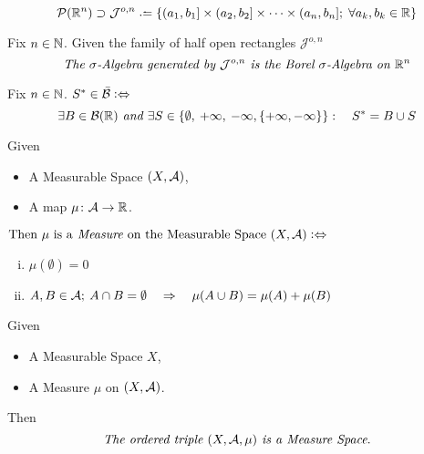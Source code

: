 \begin{definition}
$$\P(\R^n) \supset \J \defeq \{(a_1, b_1] \times (a_2, b_2] \times \dots \times (a_n, b_n]; \; \forall a_k, b_k \in \R\}$$
\end{definition}

\begin{definition}
Fix $n \in \mathbb{N}$. Given the family of half open rectangles $\mathcal{J}^{o,n}$
$$ \text{\it The } \sigma\text{\it -Algebra generated by } \mathcal{J}^{o,n}\text{\it\ is the Borel }\sigma\text{\it-Algebra on }\mathbb{R}^n$$
\end{definition}

\begin{definition}
Fix $n \in \mathbb{N}$. $S^* \in \bar {\mathcal{B}} \mathrel{\vcentcolon\Leftrightarrow}$
$$\exists B \in \mathcal{B}(\mathbb{R}) \text{\it\ and }\exists S \in \{\emptyset,\> +\infty,\> -\infty, \{+\infty, -\infty\}\}: \quad S^* = B \cup S$$
\end{definition}

\begin{definition}[Measures]
Given 
\begin{itemize}
\item
	A Measurable Space $(X, \mathcal{A})$,
\item
	A map $\mu\colon \mathcal{A} \rightarrow \mathbb{R}$.
\end{itemize}
$\text{Then } \mu \text{ is a} \emph{ Measure } \text{on the Measurable Space } (X, \mathcal{A}) \mathrel{\vcentcolon\Leftrightarrow}$
\begin{enumerate}[(i)]
\centering
\item
	$\mu(\emptyset) = 0$
\item
	$A, B \in \mathcal{A}; \> A \cap B  = \emptyset \quad \Rightarrow \quad \mu(A \cup B) = \mu(A) + \mu(B)$
\end{enumerate}
\end{definition}

\begin{definition}
Given
\begin{itemize}
\item
	A Measurable Space $X$,
\item
	A Measure $\mu$ on $(X, \mathcal{A})$.
\end{itemize}
Then
$$\text{\it The ordered triple }(X, \mathcal{A}, \mu) \text{\it \ is a } \emph{Measure Space}.$$
\end{definition}


